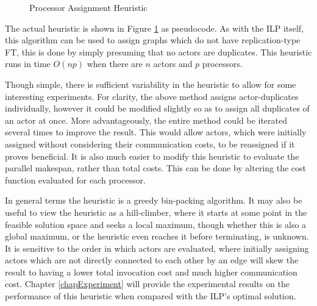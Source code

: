 \begin{figure}
\begin{center}
\caption{Processor Assignment Heuristic}
\label{figAlgAlg}
\end{center}
\end{figure}

The actual heuristic is shown in Figure \ref{figAlgAlg} as pseudocode.
As with the ILP itself, this algorithm can be used to assign graphs which do not have replication-type FT, this is done by simply presuming that no actors are duplicates.
This heuristic runs in time $O(np)$ when there are $n$ actors and $p$ processors.

Though simple, there is sufficient variability in the heuristic to allow for some interesting experiments.
For clarity, the above method assigns actor-duplicates individually, however it could be modified slightly so as to assign all duplicates of an actor at once.
More advantageously, the entire method could be iterated several times to improve the result.
This would allow actors, which were initially assigned without considering their communication costs, to be reassigned if it proves beneficial.
It is also much easier to modify this heuristic to evaluate the parallel makespan, rather than total costs.
This can be done by altering the cost function evaluated for each processor.

In general terms the heuristic is a greedy bin-packing algorithm.
It may also be useful to view the heuristic as a hill-climber, where it starts at some point in the feasible solution space and seeks a local maximum, though whether this is also a global maximum, or the heuristic even reaches it before terminating, is unknown.
It is sensitive to the order in which actors are evaluated, where initially assigning actors which are not directly connected to each other by an edge will skew the result to having a lower total invocation cost and much higher communication cost.
Chapter \ref{chapExperiment} will provide the experimental results on the performance of this heuristic when compared with the ILP's optimal solution.
